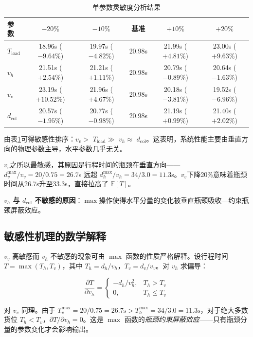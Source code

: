 \documentclass[a4paper]{cumcmthesis}
\newcommand{\headcol}{\rowcolor{tableheadcolor}}
\newcommand{\E}[1]{\mathbb{E}\left[#1\right]}
\begin{document}
\begin{table}[htbp]
\centering\small
\caption{单参数灵敏度分析结果}
\label{tab:sensitivity}
\begin{tabular}{lccccc}
\toprule
\headcol 参数 & $-20\%$ & $-10\%$ & 基准 & $+10\%$ & $+20\%$ \\
\midrule
$T_{\text{load}}$ & 18.96s ($-9.64\%$) & 19.97s ($-4.82\%$) & 20.98s & 21.99s ($+4.81\%$) & 23.00s ($+9.63\%$) \\
$v_h$ & 21.51s ($+2.54\%$) & 21.21s ($+1.11\%$) & 20.98s & 20.79s ($-0.89\%$) & 20.64s ($-1.63\%$) \\
$v_v$ & 23.19s ($+10.52\%$) & 21.96s ($+4.67\%$) & 20.98s & 20.18s ($-3.81\%$) & 19.52s ($-6.96\%$) \\
$d_{\text{col}}$ & 20.57s ($-1.95\%$) & 20.77s ($-0.98\%$) & 20.98s & 21.19s ($+0.99\%$) & 21.40s ($+2.02\%$) \\
\bottomrule
\end{tabular}
\end{table}

由表\ref{tab:sensitivity}可得敏感性排序：$v_v$$>$ $T_{\text{load}}$$\gg$ $v_h$$\approx$ $d_{\text{col}}$。这表明，系统性能主要由垂直方向的物理参数主导，水平参数几乎无关。

$v_v$之所以最敏感，其原因是行程时间的瓶颈在垂直方向——$d_v^{\max}/v_v=20/0.75=26.7$s 远超 $d_h^{\max}/v_h=34/3.0=11.3$s。$v_v$下降20\%意味着瓶颈时间从26.7s升至33.3s，直接拉高了 $\E{T}$。

\textbf{$v_h$ 与 $d_{\text{col}}$ 不敏感的原因}：$\max$操作使得水平分量的变化被垂直瓶颈吸收---约束瓶颈屏蔽效应。

\subsection{敏感性机理的数学解释}

$v_v$ 高敏感而 $v_h$ 不敏感的现象可由 $\max$ 函数的性质严格解释。设行程时间 $T=\max(T_h,T_v)$，其中 $T_h=d_h/v_h$，$T_v=d_v/v_v$。对 $v_h$ 求偏导：

\begin{equation}
\frac{\partial T}{\partial v_h} = \begin{cases}
-d_h/v_h^2, & T_h > T_v \\ 0, & T_h \leq T_v
\end{cases}
\end{equation}

对 $v_v$ 同理。由于 $T_v^{\max}=20/0.75=26.7\text{s} > T_h^{\max}=34/3.0=11.3\text{s}$，对于绝大多数货位 $T_h < T_v$，$\partial T/\partial v_h = 0$。这是 $\max$ 函数的\emph{瓶颈约束屏蔽效应}——只有瓶颈分量的参数变化才会影响输出。
\end{document}
